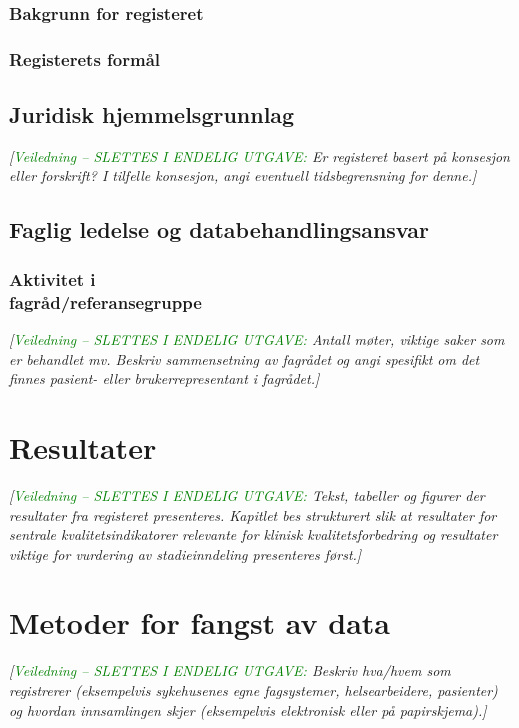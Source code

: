 \documentclass[norsk, a4paper, twocolumn]{report}
\newcommand{\newtext}[1]{\cbstart\textcolor{green}{#1\cbend}}
\newcommand{\guide}[1] {
	\textit{[\textcolor{guidegray}{\newtext{Veiledning -- SLETTES I ENDELIG
	UTGAVE:} #1}]}
	}
\begin{document}
\subsection{Bakgrunn for registeret}\label{sec:bak}
\subsection{Registerets formål}\label{sec:for}

\section{Juridisk hjemmelsgrunnlag}\label{cha:jur}
\guide{Er registeret basert på konsesjon eller forskrift? I tilfelle
konsesjon, angi eventuell tidsbegrensning for denne.}

\section{Faglig ledelse og databehandlingsansvar}\label{cha:led}
\subsection{Aktivitet i\\fagråd/referansegruppe}
\guide{Antall møter, viktige saker som er behandlet mv. Beskriv sammensetning av
fagrådet og angi spesifikt om det finnes pasient- eller brukerrepresentant i
fagrådet.}




\chapter{Resultater}\label{cha:res}
\guide{Tekst, tabeller og figurer der resultater fra registeret
presenteres. Kapitlet bes strukturert slik at resultater for sentrale
kvalitetsindikatorer relevante for klinisk kvalitetsforbedring og
resultater viktige for vurdering av stadieinndeling presenteres først.}




\chapter{Metoder for fangst av data}\label{cha:metoder}
\guide{Beskriv hva/hvem som registrerer (eksempelvis sykehusenes egne
fagsystemer, helsearbeidere, pasienter) og hvordan innsamlingen skjer
(eksempelvis elektronisk eller på papirskjema).}
\end{document}
